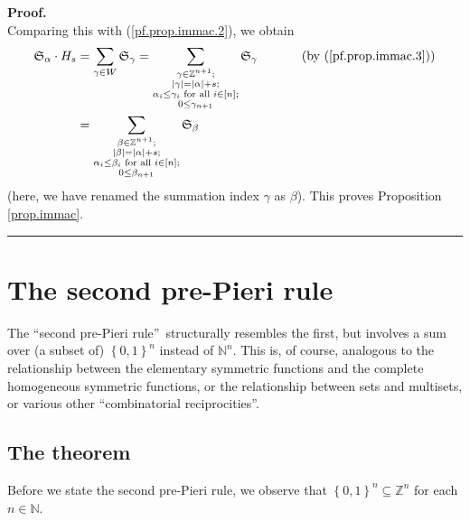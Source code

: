 \documentclass
[numbers=enddot,12pt,final,onecolumn,notitlepage,english]{scrartcl}%
\theoremstyle{definition}
\newenvironment{proof}[1][Proof]{\noindent\textbf{#1.} }{\ \rule{0.5em}{0.5em}}
\let\sumnonlimits\sum
\renewcommand{\sum}{\sumnonlimits\limits}
\newenvironment{verlong}{}{}
\begin{document}
\begin{proof}
\begin{verlong}
\[\]
Comparing this with (\ref{pf.prop.immac.2}), we obtain%
\begin{align*}
\mathfrak{S}_{\alpha}\cdot H_{s}  &  =\sum_{\gamma\in W}\mathfrak{S}_{\gamma
}=\sum_{\substack{\gamma\in\mathbb{Z}^{n+1};\\\left\vert \gamma\right\vert
=\left\vert \alpha\right\vert +s;\\\alpha_{i}\leq\gamma_{i}\text{ for all
}i\in\left[  n\right]  ;\\0\leq\gamma_{n+1}}}\mathfrak{S}_{\gamma
}\ \ \ \ \ \ \ \ \ \ \left(  \text{by (\ref{pf.prop.immac.3})}\right) \\
&  =\sum_{\substack{\beta\in\mathbb{Z}^{n+1};\\\left\vert \beta\right\vert
=\left\vert \alpha\right\vert +s;\\\alpha_{i}\leq\beta_{i}\text{ for all }%
i\in\left[  n\right]  ;\\0\leq\beta_{n+1}}}\mathfrak{S}_{\beta}%
\end{align*}
(here, we have renamed the summation index $\gamma$ as $\beta$). This proves
Proposition \ref{prop.immac}.
\end{verlong}
\end{proof}

\section{The second pre-Pieri rule}

The \textquotedblleft second pre-Pieri rule\textquotedblright\ structurally
resembles the first, but involves a sum over (a subset of) $\left\{
0,1\right\}  ^{n}$ instead of $\mathbb{N}^{n}$. This is, of course, analogous
to the relationship between the elementary symmetric functions and the
complete homogeneous symmetric functions, or the relationship between sets and
multisets, or various other \textquotedblleft combinatorial
reciprocities\textquotedblright.

\subsection{The theorem}

Before we state the second pre-Pieri rule, we observe that $\left\{
0,1\right\}  ^{n}\subseteq\mathbb{Z}^{n}$ for each $n\in\mathbb{N}$.
\end{document}
